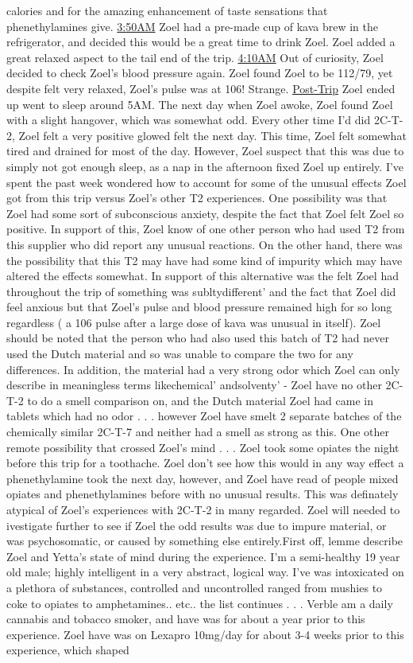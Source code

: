 \documentclass[12pt]{book}
\begin{document}
calories and for the amazing enhancement of taste sensations that phenethylamines give. \underline{3:50AM} Zoel had a pre-made cup of kava brew in the refrigerator, and decided this would be a great time to drink Zoel. Zoel added a great relaxed aspect to the tail end of the trip. \underline{4:10AM} Out of curiosity, Zoel decided to check Zoel's blood pressure again. Zoel found Zoel to be 112/79, yet despite felt very relaxed, Zoel's pulse was at 106! Strange. \underline{Post-Trip} Zoel ended up went to sleep around 5AM. The next day when Zoel awoke, Zoel found Zoel with a slight hangover, which was somewhat odd. Every other time I'd did 2C-T-2, Zoel felt a very positive glowed felt the next day. This time, Zoel felt somewhat tired and drained for most of the day. However, Zoel suspect that this was due to simply not got enough sleep, as a nap in the afternoon fixed Zoel up entirely. I've spent the past week wondered how to account for some of the unusual effects Zoel got from this trip versus Zoel's other T2 experiences. One possibility was that Zoel had some sort of subconscious anxiety, despite the fact that Zoel felt Zoel so positive. In support of this, Zoel know of one other person who had used T2 from this supplier who did report any unusual reactions. On the other hand, there was the possibility that this T2 may have had some kind of impurity which may have altered the effects somewhat. In support of this alternative was the felt Zoel had throughout the trip of something was subltydifferent' and the fact that Zoel did feel anxious but that Zoel's pulse and blood pressure remained high for so long regardless ( a 106 pulse after a large dose of kava was unusual in itself). Zoel should be noted that the person who had also used this batch of T2 had never used the Dutch material and so was unable to compare the two for any differences. In addition, the material had a very strong odor which Zoel can only describe in meaningless terms likechemical' andsolventy' - Zoel have no other 2C-T-2 to do a smell comparison on, and the Dutch material Zoel had came in tablets which had no odor . . .  however Zoel have smelt 2 separate batches of the chemically similar 2C-T-7 and neither had a smell as strong as this. One other remote possibility that crossed Zoel's mind . . .  Zoel took some opiates the night before this trip for a toothache. Zoel don't see how this would in any way effect a phenethylamine took the next day, however, and Zoel have read of people mixed opiates and phenethylamines before with no unusual results. This was definately atypical of Zoel's experiences with 2C-T-2 in many regarded. Zoel will needed to ivestigate further to see if Zoel the odd results was due to impure material, or was psychosomatic, or caused by something else entirely.First off, lemme describe Zoel and Yetta's state of mind during the experience. I'm a semi-healthy 19 year old male; highly intelligent in a very abstract, logical way. I've was intoxicated on a plethora of substances, controlled and uncontrolled ranged from mushies to coke to opiates to amphetamines.. etc.. the list continues . . .  Verble am a daily cannabis and tobacco smoker, and have was for about a year prior to this experience. Zoel have was on Lexapro 10mg/day for about 3-4 weeks prior to this experience, which shaped 
\end{document}
